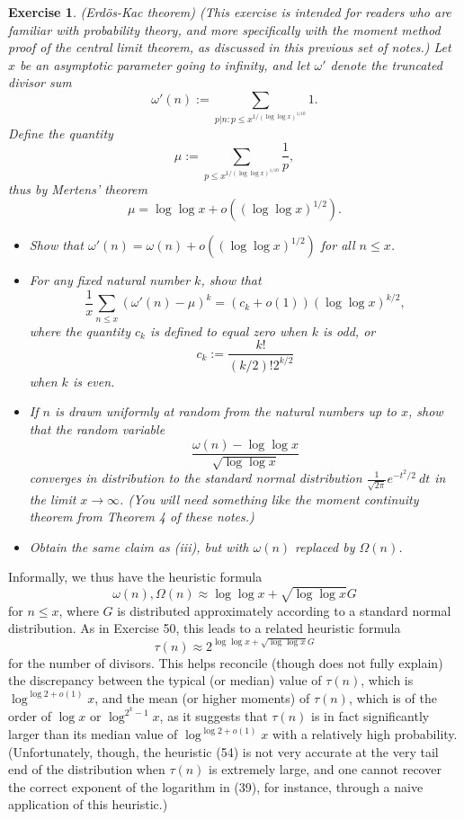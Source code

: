 \documentclass[10pt,reqno]{amsart}
\newtheorem{exercise}[theorem]{Exercise}
\begin{document}
\begin{exercise} (Erdös-Kac theorem) (This exercise is intended for readers who are familiar with probability theory, and more specifically with the moment method proof of the central limit theorem, as discussed in \emph{this previous set of notes}.) Let $x$ be an asymptotic parameter going to infinity, and let $\omega'$ denote the truncated divisor sum
    \[  \omega'(n) := \sum_{p|n: p \leq x^{1/(\log \log x)^{1/10}}} 1.\]
    Define the quantity
    \[  \mu := \sum_{p \leq x^{1/(\log \log x)^{1/10}}} \frac{1}{p},\]
    thus by Mertens’ theorem
    \[  \mu = \log\log x + o( (\log\log x)^{1/2} ).\]
    \begin{itemize}
        \item[(i)] Show that $\omega'(n) = \omega(n) + o( (\log\log x)^{1/2} )$ for all $n \leq x$.
        \item[(ii)] For any fixed natural number $k$, show that
        \[  \frac{1}{x} \sum_{n \leq x} (\omega'(n)-\mu)^k = (c_k + o(1)) (\log \log x)^{k/2},\]
        where the quantity $c_k$ is defined to equal zero when $k$ is odd, or
        \[  c_k := \frac{k!}{(k/2)! 2^{k/2}}\]
        when $k$ is even.

        \item[(iii)] If $n$ is drawn uniformly at random from the natural numbers up to $x$, show that the random variable
        \[  \frac{\omega(n) - \log\log x}{\sqrt{\log \log x}} \]
        converges in distribution to the standard normal distribution $\frac{1}{\sqrt{2\pi}} e^{-t^2/2}\ dt$ in the limit $x \rightarrow \infty$. (You will need something like the \emph{moment continuity theorem} from Theorem 4 \emph{of these notes}.)

        \item[(iv)] Obtain the same claim as (iii), but with $\omega(n)$ replaced by $\Omega(n)$.
\end{itemize}
\end{exercise}

Informally, we thus have the heuristic formula
%
\[  \omega(n),\Omega(n) \approx \log\log x + \sqrt{\log\log x} G\]
%
for $n \leq x$, where $G$ is distributed approximately according to a standard normal distribution. As in Exercise 50, this leads to a related heuristic formula
%
\begin{equation}   \tau(n) \approx 2^{\log\log x + \sqrt{\log\log x} G} \end{equation}
%
for the number of divisors. This helps reconcile (though does not fully explain) the discrepancy between the typical (or median) value of $\tau(n)$, which is $\log^{\log 2 + o(1)} x$, and the mean (or higher moments) of $\tau(n)$, which is of the order of $\log x$ or $\log^{2^k-1} x$, as it suggests that $\tau(n)$ is in fact significantly larger than its median value of $\log^{\log 2+o(1)} x$ with a relatively high probability. (Unfortunately, though, the heuristic (54) is not very accurate at the very tail end of the distribution when $\tau(n)$ is extremely large, and one cannot recover the correct exponent of the logarithm in (39), for instance, through a naive application of this heuristic.)
\end{document}
